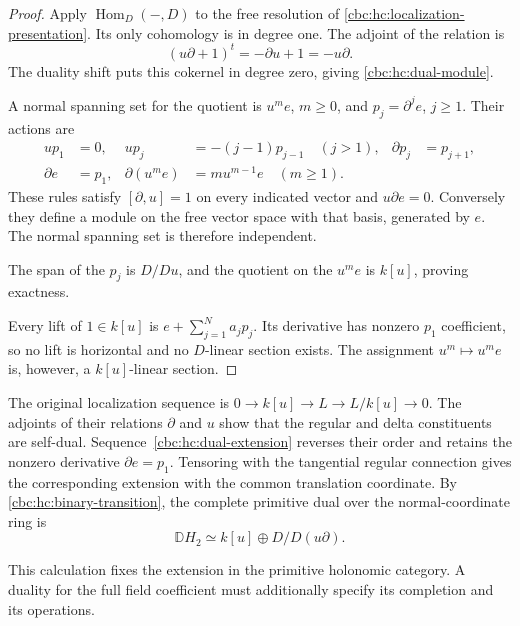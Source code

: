 \begin{proof}
Apply $\operatorname{Hom}_D(-,D)$ to the free resolution
of \eqref{cbc:hc:localization-presentation}. Its only
cohomology is in degree one. The adjoint of the relation is
\[
 (u\partial+1)^t=-\partial u+1=-u\partial.
\]
The duality shift puts this cokernel in degree zero,
giving \eqref{cbc:hc:dual-module}.

A normal spanning set for the quotient is $u^me$, $m\geq0$,
and $p_j=\partial^je$, $j\geq1$. Their actions are
\begin{align*}
 up_1&=0,& up_j&=-(j-1)p_{j-1}\quad(j>1),&
 \partial p_j&=p_{j+1},\\
 \partial e&=p_1,&
 \partial(u^me)&=m u^{m-1}e\quad(m\geq1).&&
\end{align*}
These rules satisfy $[\partial,u]=1$ on every indicated
vector and $u\partial e=0$. Conversely they define a
module on the free vector space with that basis, generated
by $e$. The normal spanning set is therefore independent.

The span of the $p_j$ is $D/Du$, and the quotient on the
$u^me$ is $k[u]$, proving exactness.

Every lift of $1\in k[u]$ is $e+\sum_{j=1}^Na_jp_j$.
Its derivative has nonzero $p_1$ coefficient, so no lift is
horizontal and no $D$-linear section exists. The assignment
$u^m\mapsto u^me$ is, however, a $k[u]$-linear section.
\end{proof}

The original localization sequence is
$0\to k[u]\to L\to L/k[u]\to0$.
The adjoints of their relations $\partial$ and $u$ show
that the regular and delta constituents are self-dual.
Sequence~\eqref{cbc:hc:dual-extension} reverses their order and
retains the nonzero derivative $\partial e=p_1$.
Tensoring with the tangential regular connection gives the
corresponding extension with the common translation coordinate.
By \eqref{cbc:hc:binary-transition}, the complete primitive
dual over the normal-coordinate ring is
\[
 \mathbb D H_2\simeq k[u]\oplus D/D(u\partial).
\]

This calculation fixes the extension in the primitive
holonomic category. A duality for the full field coefficient
must additionally specify its completion and its operations.
